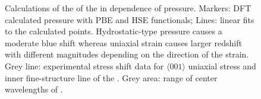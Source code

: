 	\begin{figure}[!htb]
		\centering
		\caption[Calculated dependence between \siv \ZPL and lattice pressure]{Calculations of the \wl of the \siv \ZPL in dependence of pressure. Markers: DFT calculated pressure with PBE and HSE functionals; Lines: linear fits to the calculated points. Hydrostatic-type pressure causes a moderate blue shift whereas uniaxial strain causes larger redshift with different magnitudes depending on the direction of the strain. Grey line: experimental stress shift data for $\langle 001 \rangle$ uniaxial stress and inner fine-structure line of the \siv. Grey area: range of \ZPL center wavelengths of \vl.}
		\label{fig::stress_pressure}
	\end{figure}

